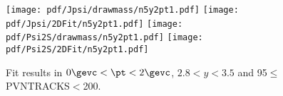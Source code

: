\begin{figure}[H]
\begin{center}
\texttt{[image: pdf/Jpsi/drawmass/n5y2pt1.pdf]}
\texttt{[image: pdf/Jpsi/2DFit/n5y2pt1.pdf]}
\vspace*{-0.5cm}
\texttt{[image: pdf/Psi2S/drawmass/n5y2pt1.pdf]}
\texttt{[image: pdf/Psi2S/2DFit/n5y2pt1.pdf]}
\vspace*{-0.5cm}
\end{center}
\caption{Fit results in $0\gevc<\pt<2\gevc$, $2.8<y<3.5$ and 95$\leq$PVNTRACKS$<$200.}
\label{Fitn5y2pt1}
\end{figure}
